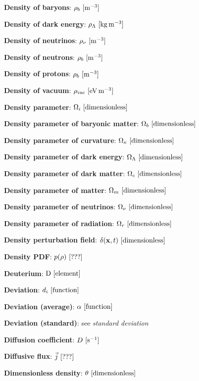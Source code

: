 \documentclass[a4paper,10pt]{article}
\begin{document}
{\noindent}\textbf{Density of baryons}: $\rho_b ~ [{\rm m^{-3}}]$

{\noindent}\textbf{Density of dark energy}: $\rho_\Lambda ~ [{\rm kg\,m^{-3}}]$

{\noindent}\textbf{Density of neutrinos}: $\rho_\nu ~ [{\rm m^{-3}}]$

{\noindent}\textbf{Density of neutrons}: $\rho_b ~ [{\rm m^{-3}}]$

{\noindent}\textbf{Density of protons}: $\rho_b ~ [{\rm m^{-3}}]$

{\noindent}\textbf{Density of vacuum}: $\rho_\mathrm{vac} ~ [{\rm eV\,m^{-3}}]$

{\noindent}\textbf{Density parameter}: $\Omega_i ~ [{\rm dimensionless}]$

{\noindent}\textbf{Density parameter of baryonic matter}: $\Omega_b ~
[{\rm dimensionless}]$

{\noindent}\textbf{Density parameter of curvature}: $\Omega_\kappa ~ [{\rm dimensionless}]$

{\noindent}\textbf{Density parameter of dark energy}: $\Omega_\Lambda ~ [{\rm dimensionless}]$

{\noindent}\textbf{Density parameter of dark matter}: $\Omega_c ~ [{\rm dimensionless}]$

{\noindent}\textbf{Density parameter of matter}: $\Omega_m ~ [{\rm dimensionless}]$

{\noindent}\textbf{Density parameter of neutrinos}: $\Omega_\nu ~ [{\rm dimensionless}]$

{\noindent}\textbf{Density parameter of radiation}: $\Omega_r ~ [{\rm dimensionless}]$

{\noindent}\textbf{Density perturbation field}: $\delta(\mathbf{x},t) ~ [{\rm dimensionless}]$

{\noindent}\textbf{Density PDF}: $p(\rho) ~ [{\rm ???}]$

{\noindent}\textbf{Deuterium}: ${\rm D} ~ [{\rm element}]$

{\noindent}\textbf{Deviation}: $d_i ~ [{\rm function}]$

{\noindent}\textbf{Deviation (average)}: $\alpha ~ [{\rm function}]$

{\noindent}\textbf{Deviation (standard)}: see \textit{standard deviation}

{\noindent}\textbf{Diffusion coefficient}: $D ~ [{\rm s^{-1}}]$

{\noindent}\textbf{Diffusive flux}: $\vec{j} ~ [{\rm ???}]$

{\noindent}\textbf{Dimensionless density}: $\theta ~ [{\rm dimensionless}]$
\end{document}
